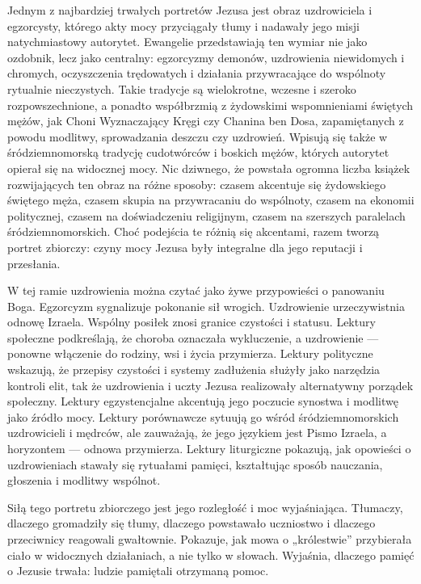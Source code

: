 Jednym z najbardziej trwałych portretów Jezusa jest obraz uzdrowiciela i egzorcysty, którego akty mocy przyciągały tłumy i nadawały jego misji natychmiastowy autorytet.
Ewangelie przedstawiają ten wymiar nie jako ozdobnik, lecz jako centralny: egzorcyzmy demonów, uzdrowienia niewidomych i chromych, oczyszczenia trędowatych i działania przywracające do wspólnoty rytualnie nieczystych.
Takie tradycje są wielokrotne, wczesne i szeroko rozpowszechnione, a ponadto współbrzmią z żydowskimi wspomnieniami świętych mężów, jak Choni Wyznaczający Kręgi czy Chanina ben Dosa, zapamiętanych z powodu modlitwy, sprowadzania deszczu czy uzdrowień.
Wpisują się także w śródziemnomorską tradycję cudotwórców i boskich mężów, których autorytet opierał się na widocznej mocy.
Nic dziwnego, że powstała ogromna liczba książek rozwijających ten obraz na różne sposoby: czasem akcentuje się żydowskiego świętego męża, czasem skupia na przywracaniu do wspólnoty, czasem na ekonomii politycznej, czasem na doświadczeniu religijnym, czasem na szerszych paralelach śródziemnomorskich.
Choć podejścia te różnią się akcentami, razem tworzą portret zbiorczy: czyny mocy Jezusa były integralne dla jego reputacji i przesłania.

W tej ramie uzdrowienia można czytać jako żywe przypowieści o panowaniu Boga.
Egzorcyzm sygnalizuje pokonanie sił wrogich.
Uzdrowienie urzeczywistnia odnowę Izraela.
Wspólny posiłek znosi granice czystości i statusu.
Lektury społeczne podkreślają, że choroba oznaczała wykluczenie, a uzdrowienie — ponowne włączenie do rodziny, wsi i życia przymierza.
Lektury polityczne wskazują, że przepisy czystości i systemy zadłużenia służyły jako narzędzia kontroli elit, tak że uzdrowienia i uczty Jezusa realizowały alternatywny porządek społeczny.
Lektury egzystencjalne akcentują jego poczucie synostwa i modlitwę jako źródło mocy.
Lektury porównawcze sytuują go wśród śródziemnomorskich uzdrowicieli i mędrców, ale zauważają, że jego językiem jest Pismo Izraela, a horyzontem — odnowa przymierza.
Lektury liturgiczne pokazują, jak opowieści o uzdrowieniach stawały się rytuałami pamięci, kształtując sposób nauczania, głoszenia i modlitwy wspólnot.

Siłą tego portretu zbiorczego jest jego rozległość i moc wyjaśniająca.
Tłumaczy, dlaczego gromadziły się tłumy, dlaczego powstawało uczniostwo i dlaczego przeciwnicy reagowali gwałtownie.
Pokazuje, jak mowa o „królestwie” przybierała ciało w widocznych działaniach, a nie tylko w słowach.
Wyjaśnia, dlaczego pamięć o Jezusie trwała: ludzie pamiętali otrzymaną pomoc.

